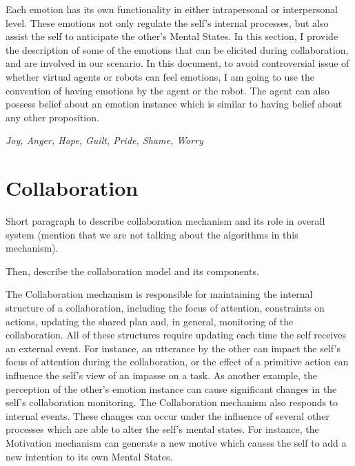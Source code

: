 \documentclass[letterpaper]{article}
\begin{document}
Each emotion has its own functionality in either intrapersonal or interpersonal
level. These emotions not only regulate the self's internal processes, but also
assist the self to anticipate the other's Mental States. In this section, I
provide the description of some of the emotions that can be elicited during
collaboration, and are involved in our scenario. In this document, to avoid
controversial issue of whether virtual agents or robots can feel emotions, I am
going to use the convention of having emotions by the agent or the robot. The
agent can also possess belief about an emotion instance which is similar to
having belief about any other proposition.

\textit{Joy, Anger, Hope, Guilt, Pride, Shame, Worry}

\section{Collaboration}

Short paragraph to describe collaboration mechanism and its role in overall
system (mention that we are not talking about the algorithms in this mechanism).

Then, describe the collaboration model and its components.

The Collaboration mechanism is responsible for maintaining the internal
structure of a collaboration, including the focus of attention, constraints on
actions, updating the shared plan and, in general, monitoring of the
collaboration. All of these structures require updating each time the self
receives an external event. For instance, an utterance by the other can impact
the self's focus of attention during the collaboration, or the effect of a
primitive action can influence the self's view of an impasse on a task. As
another example, the perception of the other's emotion instance can cause
significant changes in the self's collaboration monitoring. The Collaboration
mechanism also responds to internal events. These changes can occur under the
influence of several other processes which are able to alter the self's mental
states. For instance, the Motivation mechanism can generate a new motive which
causes the self to add a new intention to its own Mental States.
\end{document}
